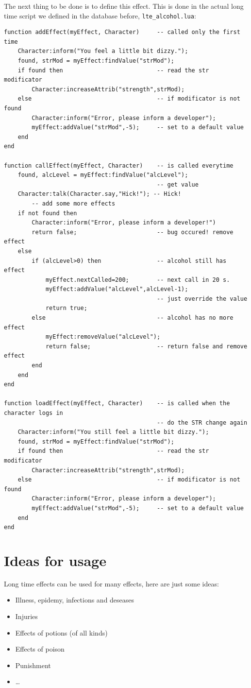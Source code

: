 \documentclass[a4paper,10pt,makeidx]{scrreprt}
\begin{document}
The next thing to be done is to define this effect. This is done in the actual long time script we defined in the database before, {\tt lte\_alcohol.lua}:
\begin{verbatim}
function addEffect(myEffect, Character)     -- called only the first time
    Character:inform("You feel a little bit dizzy.");
    found, strMod = myEffect:findValue("strMod");
    if found then                           -- read the str modificator
        Character:increaseAttrib("strength",strMod);
    else                                    -- if modificator is not found
        Character:inform("Error, please inform a developer");
        myEffect:addValue("strMod",-5);     -- set to a default value
    end
end

function callEffect(myEffect, Character)    -- is called everytime
    found, alcLevel = myEffect:findValue("alcLevel");
                                            -- get value
    Character:talk(Character.say,"Hick!"); -- Hick!
        -- add some more effects
    if not found then
        Character:inform("Error, please inform a developer!")
        return false;                       -- bug occured! remove effect
    else
        if (alcLevel>0) then                -- alcohol still has effect
            myEffect.nextCalled=200;        -- next call in 20 s.
            myEffect:addValue("alcLevel",alcLevel-1);
                                            -- just override the value
            return true;
        else                                -- alcohol has no more effect
            myEffect:removeValue("alcLevel");
            return false;                   -- return false and remove effect
        end
    end
end

function loadEffect(myEffect, Character)    -- is called when the character logs in
                                            -- do the STR change again
    Character:inform("You still feel a little bit dizzy.");
    found, strMod = myEffect:findValue("strMod");
    if found then                           -- read the str modificator
        Character:increaseAttrib("strength",strMod);
    else                                    -- if modificator is not found
        Character:inform("Error, please inform a developer");
        myEffect:addValue("strMod",-5);     -- set to a default value
    end
end
\end{verbatim}

\section{Ideas for usage}
Long time effects can be used for many effects, here are just some ideas:
\begin{itemize}
\item Illness, epidemy, infections and deseases
\item Injuries
\item Effects of potions (of all kinds)
\item Effects of poison
\item Punishment
\item \dots
\end{itemize}
\end{document}
